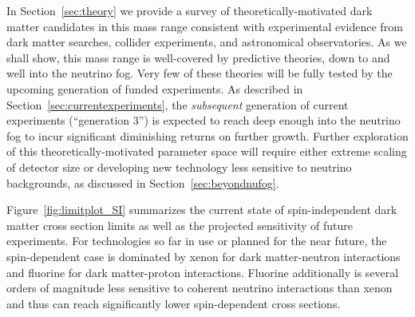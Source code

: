 In Section~\ref{sec:theory} we provide a survey of theoretically-motivated dark matter candidates in this mass range consistent with experimental evidence from dark matter searches, collider experiments, and astronomical observatories. As we shall show, this mass range is well-covered by predictive theories, down to and well into the neutrino fog. Very few of these theories will be fully tested by the upcoming generation of funded experiments. As described in Section~\ref{sec:currentexperiments}, the \textit{subsequent} generation of current experiments (``generation 3'') is expected to reach deep enough into the neutrino fog to incur significant diminishing returns on further growth.  Further exploration of this theoretically-motivated parameter space will require either extreme scaling of detector size or developing new technology less sensitive to neutrino backgrounds, as discussed in Section~\ref{sec:beyondnufog}.

Figure~\ref{fig:limitplot_SI} summarizes the current state of spin-independent dark matter cross section limits as well as the projected sensitivity of future experiments. For technologies so far in use or planned for the near future, the spin-dependent case is dominated by xenon for dark matter-neutron interactions and fluorine for dark matter-proton interactions. Fluorine additionally is several orders of magnitude less sensitive to coherent neutrino interactions than xenon and thus can reach significantly lower spin-dependent cross sections. 

